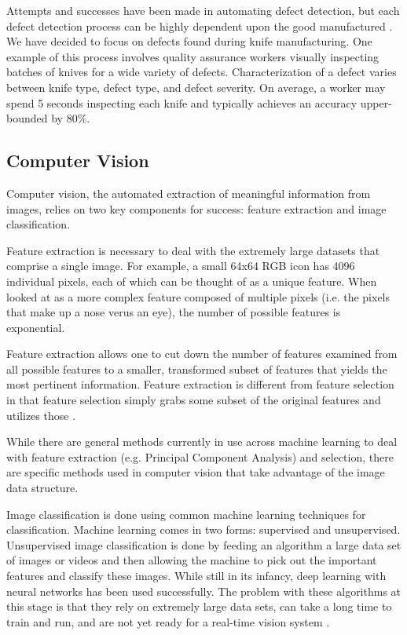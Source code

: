 \documentclass[letterpaper, 10 pt, conference]{ieeeconf}  %
\begin{document}
Attempts and successes have been made in automating defect detection, but each defect detection process can be highly dependent upon the good manufactured \cite{defectGabor}\cite{defectSewer}. We have decided to focus on defects found during knife manufacturing. One example of this process involves quality assurance workers visually inspecting batches of knives for a wide variety of defects. Characterization of a defect varies between knife type, defect type, and defect severity. On average, a worker may spend 5 seconds inspecting each knife and typically achieves an accuracy upper-bounded by 80\%.

\subsection{Computer Vision}

Computer vision, the automated extraction of meaningful information from images, relies on two key components for success: feature extraction and image classification. 

Feature extraction is necessary to deal with the extremely large datasets that comprise a single image.  For example, a small 64x64 RGB icon has 4096 individual pixels, each of which can be thought of as a unique feature. When looked at as a more complex feature composed of multiple pixels (i.e. the pixels that make up a nose verus an eye), the number of possible features is exponential. 


Feature extraction allows one to cut down the number of features examined from all possible features to a smaller, transformed subset of features that yields the most pertinent information. Feature extraction is different from feature selection in that feature selection simply grabs some subset of the original features and utilizes those \cite{featSelExt}.

While there are general methods currently in use across machine learning to deal with feature extraction (e.g. Principal Component Analysis) and selection, there are specific methods used in computer vision that take advantage of the image data structure.

Image classification is done using common machine learning techniques for classification. Machine learning comes in two forms: supervised and unsupervised. Unsupervised image classification is done by feeding an algorithm a large data set of images or videos and then allowing the machine to pick out the important features and classify these images. While still in its infancy, deep learning with neural networks has been used successfully. The problem with these algorithms at this stage is that they rely on extremely large data sets, can take a long time to train and run, and are not yet ready for a real-time vision system \cite{deepLearning1}. 
\end{document}

